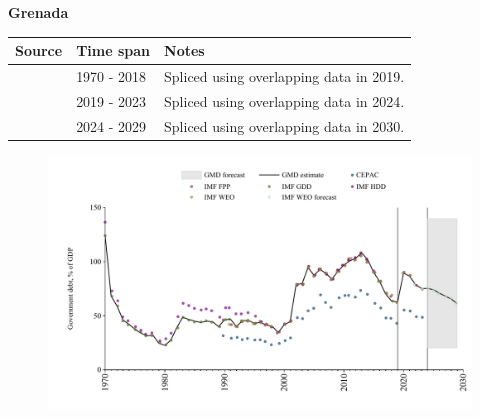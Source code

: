 \documentclass[12pt,a4paper,landscape]{article}
\begin{document}
\begin{adjustbox}{max totalsize={\paperwidth}{\paperheight},center}
\begin{minipage}[t][\textheight][t]{\textwidth}
\vspace*{0.5cm}
{}
\begin{center}
{\Large\bfseries Grenada}
\end{center}
\vspace{0.5cm}
\begin{table}[H]
\centering
\small
\begin{tabular}{|l|l|l|}
\hline
\textbf{Source} & \textbf{Time span} & \textbf{Notes} \\
\hline
\rowcolor{white}\cite{IMF_GDD}& 1970 - 2018 &Spliced using overlapping data in 2019.\\
\rowcolor{lightgray}\cite{IMF_FPP}& 2019 - 2023 &Spliced using overlapping data in 2024.\\
\rowcolor{white}\cite{IMF_WEO_forecast}& 2024 - 2029 &Spliced using overlapping data in 2030.\\
\hline
\end{tabular}
\end{table}
\begin{figure}[H]
\centering
\includegraphics[width=\textwidth,height=0.6\textheight,keepaspectratio]{graphs/GRD_govdebt_GDP.pdf}
\end{figure}
\end{minipage}
\end{adjustbox}
\end{document}
